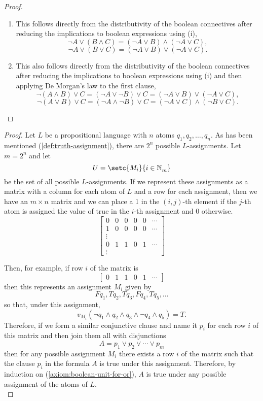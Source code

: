 \documentclass[../MathsNotesBase.tex]{subfiles}
\begin{document}
{\begin{proof}
\begin{enumerate}[label=(\roman*)]
 				\nl
 				\item This follows directly from the distributivity of the boolean connectives after reducing the implications to boolean expressions using (i),
 					\[ \lnot A \lor (B \land C) = (\lnot A \lor B) \land (\lnot A \lor C), \]
 					\[ \lnot A \lor (B \lor C) = (\lnot A \lor B) \lor (\lnot A \lor C). \]
 					
 				\nl
 				\item This also follows directly from the distributivity of the boolean connectives after reducing the implications to boolean expressions using (i) and then applying De Morgan's law to the first clause,
 				\[ \lnot(A \land B) \lor C = (\lnot A \lor \lnot B) \lor C = (\lnot A \lor B) \lor (\lnot A \lor C), \]
 				\[ \lnot(A \lor B) \lor C = (\lnot A \land \lnot B) \lor C = (\lnot A \lor C) \land (\lnot B \lor C). \]					
 			\end{enumerate}
 		\end{proof}
 		
 		\bigskip
 		\begin{proof}
 			Let $L$ be a propositional language with $n$ atoms ${ q_1, q_2, \dots, q_n }$. As has been mentioned (\ref{def:truth-assignment}), there are $2^n$ possible $L$-assignments. Let ${ m = 2^n }$ and let
 			\[ U = \setc{M_i}{i \in \N{}_m} \]
 			be the set of all possible $L$-assignments. If we represent these assignments as a matrix with a column for each atom of $L$ and a row for each assignment, then we have an ${ m \times n }$ matrix and we can place a 1 in the $(i,j)$-th element if the $j$-th atom is assigned the value of true in the $i$-th assignment and 0 otherwise.
 			\[
 				\begin{bmatrix}
 					0 & 0 & 0 & 0 & 0 & \cdots \\
 					1 & 0 & 0 & 0 & 0 & \cdots \\
 					\vdots \\
 					0 & 1 & 1 & 0 & 1 & \cdots \\
 					\vdots
 				\end{bmatrix} 
 			\]
 			
 			Then, for example, if row $i$ of the matrix is
 			\[ \begin{bmatrix}0 & 1 & 1 & 0 & 1 & \cdots\end{bmatrix} \]
 			then this represents an assignment $M_i$ given by
 			\[ Fq_1, Tq_2, Tq_3, Fq_4, Tq_5, \dots \]
 			so that, under this assignment,
 			\[ v_{M_i}(\lnot q_1 \land q_2 \land q_3 \land \lnot q_4 \land q_5) = T. \]
 			Therefore, if we form a similar conjunctive clause and name it $p_i$ for each row $i$ of this matrix and then join them all with disjunctions
 			\[ A = p_1 \lor p_2 \lor \cdots \lor p_m \]
 			then for any possible assignment $M_i$ there exists a row $i$ of the matrix such that the clause $p_i$ in the formula $A$ is true under this assignment. Therefore, by induction on (\ref{axiom:boolean-unit-for-or}), $A$ is true under any possible assignment of the atoms of $L$.\\
 			

\end{proof}}
\end{document}
